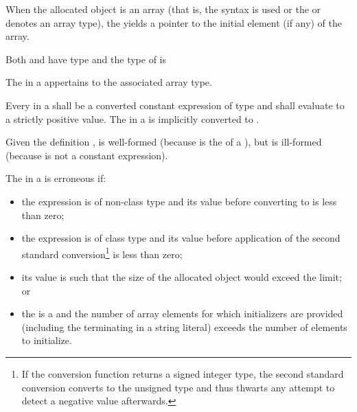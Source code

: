\pnum
{}%
When the allocated object is an array (that is, the
 syntax is used or the
 or  denotes an array type), the
 yields a pointer to the initial element (if
any) of the array.
\begin{note}
Both  and  have type  and
the type of  is 
\end{note}
The  in a  appertains
to the associated array type.

\pnum
Every  in a
 shall be a converted constant
expression of type  and
shall evaluate to a strictly positive value.
%
The  in a  is
implicitly converted to .
\begin{example}
Given the definition ,
 is well-formed (because  is the
 of a ), but
 is ill-formed (because  is not a
constant expression).
\end{example}

\pnum
{}%
The  in a  is
erroneous if:

\begin{itemize}
\item
the expression is of non-class type and its value before converting to
 is less than zero;

\item
the expression is of class type and its value before application of the second
standard conversion\footnote{If the conversion function
returns a signed integer type, the second standard conversion converts to the
unsigned type  and thus thwarts any attempt to detect a
negative value afterwards.} is less than zero;

\item
its value is such that the size of the allocated object would exceed the
 limit; or

\item
the  is a  and the
number of array elements for which initializers are provided (including the
terminating  in a string literal) exceeds the
number of elements to initialize.
\end{itemize}

